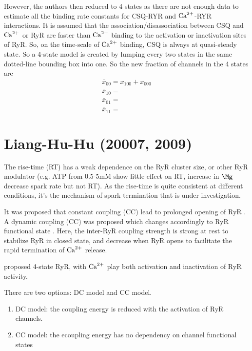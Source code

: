 However, the authors then reduced to 4 states as there are not enough data to
estimate all the binding rate constants for CSQ-RYR and ${\text{Ca}^{2+}}$-RYR interactions.
It is assumed that the association/disassociation between CSQ and ${\text{Ca}^{2+}}$ or RyR
are faster than ${\text{Ca}^{2+}}$ binding to the activation or inactivation sites of RyR.
So, on the time-scale of ${\text{Ca}^{2+}}$ binding, CSQ is always at quasi-steady state. So
a 4-state model is created by lumping every two states in the same dotted-line
bounding box into one. So the new fraction of channels in the 4 states are
\begin{equation}
\begin{split}
\bar{x}_{00} = x_{100} + x_{000} \\
\bar{x}_{10} = \\
\bar{x}_{01} = \\
\bar{x}_{11} =
\end{split}
\end{equation}



\section{Liang-Hu-Hu (20007, 2009)}
\label{sec:RyR_Liang2007_2009}

The rise-time (RT) has a weak dependence on the RyR cluster size, or other RyR
modulator (e.g. ATP from 0.5-5mM show little effect on RT, increase in $\Mg$
decrease spark rate but not RT). As the rise-time is quite consistent at
different conditions, it's the mechanism of spark termination that is under
investigation.

It was proposed that constant coupling (CC) lead to prolonged opening of RyR
\citep{marx2001}. A dynamic coupling (CC) was proposed which changes accordingly
to RyR functional state \citep{Liang2007}. Here, the inter-RyR coupling strength
is strong at rest to stabilize RyR in closed state, and decrease when RyR opens
to facilitate the rapid termination of ${\text{Ca}^{2+}}$ release.

\citep{Liang2007, Liang2009} proposed 4-state RyR, with ${\text{Ca}^{2+}}$ play both
activation and inactivation of RyR activity.


There are two options:
DC model and CC model.

\begin{enumerate}
  \item DC model: the coupling energy is reduced with the activation of RyR
  channels.
  \item CC model: the ecoupling energy has no dependency on channel functional
  states
\end{enumerate}



